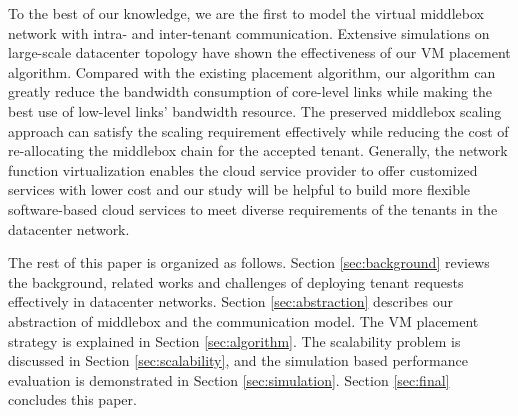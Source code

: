 \documentclass[review]{elsarticle}
\begin{document}
To the best of our knowledge, we are the first to model the virtual middlebox network with intra- and inter-tenant communication.
Extensive simulations on large-scale datacenter topology have shown the effectiveness of our VM placement
algorithm.
Compared with the existing placement algorithm, our algorithm can greatly reduce the bandwidth consumption of core-level links while making the best use of low-level links' bandwidth resource. The preserved middlebox scaling approach can satisfy the scaling requirement effectively while reducing the cost of re-allocating the middlebox chain for the accepted tenant. %
Generally, the network function virtualization enables the cloud service provider to offer customized services with lower cost and our study will be helpful to build more flexible software-based cloud services to meet diverse requirements of  the tenants in the datacenter network.


The rest of this paper is organized as follows. Section  \ref{sec:background} reviews the background, related works and challenges of deploying tenant requests effectively in datacenter networks.
Section \ref{sec:abstraction} describes our abstraction of middlebox and the communication model. The VM placement strategy is explained in Section \ref{sec:algorithm}. The scalability problem is discussed in Section \ref{sec:scalability}, and the simulation based performance evaluation is demonstrated in Section \ref{sec:simulation}. Section \ref{sec:final} concludes this paper.
\end{document}
